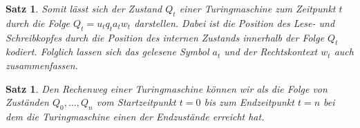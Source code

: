 \documentclass[]{scrartcl}
\newtheorem{satz}[definition]{Satz}
\begin{document}
			\begin{satz}
			Somit lässt sich der Zustand $Q_t$ einer Turingmaschine zum Zeitpunkt $t$ durch die Folge $Q_t = u_tq_ta_tw_t$ darstellen. Dabei ist die Position des Lese- und Schreibkopfes durch die Position des internen Zustands innerhalb der Folge $Q_t$ kodiert. Folglich lassen sich das gelesene Symbol $a_t$ und der Rechtskontext $w_t$ auch zusammenfassen.
			\end{satz}
			
			\begin{satz}
			Den Rechenweg einer Turingmaschine können wir als die Folge von Zuständen $Q_0, ..., Q_n$ vom Startzeitpunkt $t = 0$ bis zum Endzeitpunkt $t = n$ bei dem die Turingmaschine einen der Endzustände erreicht hat.
			\end{satz}
		
\end{document}
